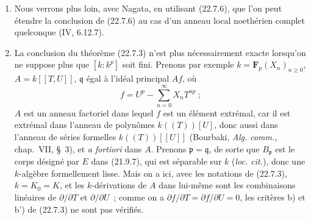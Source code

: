 \begin{remarks}[22.7.7]
\label{0.22.7.7-fr}
\begin{enumerate}
  \item[(i)] Nous verrons plus loin, avec Nagata, en utilisant (22.7.6), que
  l'on peut étendre la conclusion de (22.7.6) au cas d'un anneau local
  noethérien complet quelconque (IV, 6.12.7).

  \item[(ii)] La conclusion du théorème (22.7.3) n'est plus nécessairement
  exacte lorsqu'on ne suppose plus que $[k:k^p]$ soit fini. Prenons par
  exemple $k=\mathbf F_p(X_n)_{n\geqslant0}$,
  $A=k[[T,U]]$, $\mathfrak q$ égal à l'idéal principal $Af$, où
  \[
    f=U^p-\sum_{n=0}^{\infty}X_nT^{np}~;
  \]
  $A$ est un anneau factoriel dans lequel $f$ est un élément extrémal, car il
  est extrémal dans l'anneau de polynômes $k((T))[U]$, donc aussi dans
  l'anneau de séries formelles $k((T))[[U]]$ (Bourbaki,
  \emph{Alg. comm.}, chap.~VII, §~3), et \emph{a fortiori} dans $A$.
  Prenons $\mathfrak p=\mathfrak q$, de sorte que $B_{\mathfrak p}$ est le
  corps désigné par $E$ dans (21.9.7), qui est séparable sur $k$
  (\emph{loc. cit.}), donc une $k$-algèbre formellement lisse. Mais on a ici,
  avec les notations de (22.7.3), $k=K_0=K$, et les $k$-dérivations de $A$
  dans lui-même sont les combinaisons linéaires de $\partial/\partial T$ et
  $\partial/\partial U$~; comme on a
  $\partial f/\partial T=\partial f/\partial U=0$, les critères b) et b') de
  (22.7.3) ne sont pas vérifiés.
\end{enumerate}
\end{remarks}
